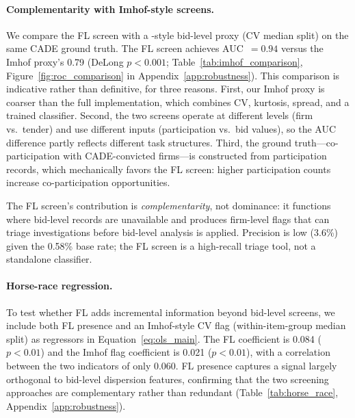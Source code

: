 \paragraph{Complementarity with Imhof-style screens.}
We compare the FL screen with a \citet{imhof2019detecting}-style
bid-level proxy (CV median split) on the same CADE ground truth. The
FL screen achieves AUC~$= 0.94$ versus the Imhof proxy's 0.79
(DeLong $p < 0.001$; Table~\ref{tab:imhof_comparison},
Figure~\ref{fig:roc_comparison} in Appendix~\ref{app:robustness}).
This comparison is indicative rather than definitive, for three
reasons. First, our Imhof proxy is coarser than the full
\citet{imhof2019detecting} implementation, which combines CV,
kurtosis, spread, and a trained classifier. Second, the two screens
operate at different levels (firm vs.\ tender) and use different
inputs (participation vs.\ bid values), so the AUC difference partly
reflects different task structures. Third, the ground
truth---co-participation with CADE-convicted firms---is constructed
from participation records, which mechanically favors the FL screen:
higher participation counts increase co-participation opportunities.

The FL screen's contribution is \emph{complementarity}, not
dominance: it functions where bid-level records are unavailable and
produces firm-level flags that can triage investigations before
bid-level analysis is applied. Precision is low (3.6\%) given the
0.58\% base rate; the FL screen is a high-recall triage tool, not a
standalone classifier.

\paragraph{Horse-race regression.}
To test whether FL adds incremental information beyond bid-level
screens, we include both FL presence and an Imhof-style CV flag
(within-item-group median split) as regressors in
Equation~\eqref{eq:ols_main}. The FL coefficient is 0.084
($p < 0.01$) and the Imhof flag coefficient is 0.021 ($p < 0.01$),
with a correlation between the two indicators of only 0.060. FL
presence captures a signal largely orthogonal to bid-level
dispersion features, confirming that the two screening approaches
are complementary rather than redundant
(Table~\ref{tab:horse_race}, Appendix~\ref{app:robustness}).




